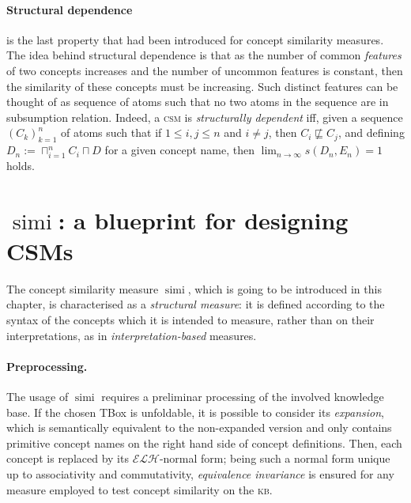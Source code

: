 \documentclass[]{llncs}
\DeclareMathOperator{\simi}{simi}
\theoremstyle{remark}
\newcommand{\elh}{\(\mathcal{ELH}{}\)}
\newcommand{\kb}{\textsc{kb}}
\newcommand{\csm}{\textsc{csm}}
\begin{document}
  \paragraph{Structural dependence} is the last property that had been introduced for concept similarity measures.
  The idea behind structural dependence is that as the number of common \emph{features} of two concepts increases and the number of uncommon features is constant, then the similarity of these concepts must be increasing.
  Such distinct features can be thought of as sequence of atoms such that no two atoms in the sequence are in subsumption relation.
  Indeed, a \csm{} is \emph{structurally dependent} iff, given a sequence \({(C_k)}_{k=1}^n\) of atoms such that if \(1 \le i,j \le n\) and \(i \ne j\), then \(C_i \not\sqsubseteq C_j\), and defining \(D_n := \sqcap_{i=1}^n C_i \sqcap D\) for a given concept name, then \(\lim_{n \to \infty}s(D_n,E_n) = 1\) holds.

  \section{\(\simi{}\): a blueprint for designing CSMs}

  The concept similarity measure \(\simi\), which is going to be introduced in this chapter, is characterised as a \emph{structural measure}: it is defined according to the syntax of the concepts which it is intended to measure, rather than on their interpretations, as in \emph{interpretation-based} measures.

  \paragraph{Preprocessing.}
  The usage of \(\simi{}\) requires a preliminar processing of the involved knowledge base.
  If the chosen TBox is unfoldable, it is possible to consider its \emph{expansion}, which is semantically equivalent to the non-expanded version and only contains primitive concept names on the right hand side of concept definitions.
  Then, each concept is replaced by its \elh-normal form; being such a normal form unique up to associativity and commutativity, \emph{equivalence invariance} is ensured for any measure employed to test concept similarity on the \kb.
\end{document}
